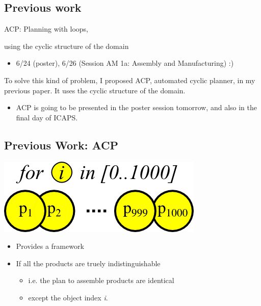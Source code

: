 \subsection{Previous work}
\label{sec-1-1}

\begin{center}
\begin{xlarge}
ACP: Planning with loops,

using the cyclic structure of the domain
\end{xlarge}

\begin{itemize}
\item 6/24 (poster), 6/26 (Session AM 1a: Assembly and Manufacturing) :)
\end{itemize}
\end{center}


\begin{resume}
To solve this kind of problem, I proposed ACP, automated cyclic planner, in my
previous paper. It uses the cyclic structure of the domain.
\begin{itemize}
\item ACP is going to be presented in the poster session tomorrow,
and also in the final day of ICAPS.
\end{itemize}
\end{resume}



\subsection{Previous Work: ACP}
\label{sec-1-2}

\includegraphics[width=.9\linewidth]{img/indices.png}

\begin{itemize}
\item Provides a framework
\item If all the products are truely indistinguishable
\begin{itemize}
\item i.e. the plan to assemble products are identical
\item except the object index \emph{i}.
\end{itemize}
\end{itemize}

